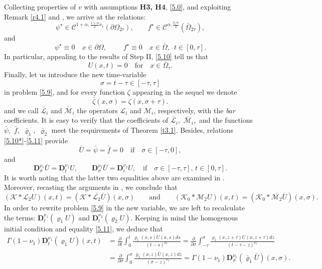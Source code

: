 \documentclass[reqno]{amsart}
\def\C {\mathcal{C}}
\theoremstyle{definition}
\numberwithin{equation}{section}
\begin{document}
Collecting properties of $v$ with assumptions \textbf{H3, H4}, \eqref{5.0}, and exploiting  Remark \ref{r4.1} and  \cite[Lemma 4.1]{KPV1}, we arrive at the relations:
\begin{equation}
\label{5.10*}
\psi^{\star}\in\C^{1+\alpha,\frac{1+\alpha}{2}\nu_{1}}(\partial\Omega_{2\tau}),\qquad f^{\star}\in\C^{\alpha,\frac{\nu_{1}\alpha}{2}}(\bar{\Omega}_{2\tau}),
\end{equation}
and
\begin{equation}\label{5.10}
\psi^{\star}\equiv 0 \quad x\in\partial\Omega, \,\,\qquad f^{\star}\equiv 0\quad x\in\bar{\Omega},\,\,\,  t\in[0,\tau].
\end{equation}
In particular, appealing to the results of Step II, \eqref{5.10} tell us that
\begin{equation}\label{5.11}
U(x,t)=0\quad\text{for}\quad x\in\bar{\Omega}_{\tau}.
\end{equation}
Finally, let us introduce the new time-variable
\[
\sigma=t-\tau\in[-\tau,\tau]
\]
in problem \eqref{5.9}, and for every function $\zeta$ appearing in the sequel we denote
$$\bar{\zeta}(x,\sigma)=\zeta(x,\sigma+\tau).$$
and we call 
$\bar{\mathcal{L}}_{i}$ and $\bar{\mathcal{M}}_{i}$ the operators 
${\mathcal{L}}_{i}$ and ${\mathcal{M}}_{i}$, respectively, with the \emph{bar} coefficients.
It is easy to verify that the coefficients of $\bar{\mathcal{L}}_{i},$ $\bar{\mathcal{M}}_{i},$ 
and the functions
$\bar{\psi},$ $\bar{f},$ $\bar{\varrho}_{1},$ $\bar{\varrho}_2$  meet the requirements of Theorem \ref{t3.1}. Besides, relations \eqref{5.10*}-\eqref{5.11} provide
$$
\bar{U}=\bar{\psi}=\bar{f}=0\quad\text{if}\quad \sigma\in[-\tau,0],$$
and
$$
\mathbf{D}_{\sigma}^{\nu_{1}}\bar{U}=\mathbf{D}_{t}^{\nu_{1}}U,\qquad
\mathbf{D}_{\sigma}^{\nu_{2}}\bar{U}=\mathbf{D}_{t}^{\nu_{2}}U,\quad\text{if}\quad \sigma\in[-\tau,\tau],\, t\in[0,\tau].
$$
It is worth noting that the latter two equalities above are examined in  \cite[(3.111)]{KV1}. Moreover, recasting the arguments in \cite[p.441]{KPV1}, we conclude that
\[
(\mathcal{K}*\mathcal{L}_{2}U)(x,t)=(\mathcal{K}*\bar{\mathcal{L}_{2}}\bar{U})(x,\sigma)\qquad
\text{and}\qquad
(\mathcal{K}_{0}*\mathcal{M}_{2}U)(x,t)=(\mathcal{K}_{0}*\bar{\mathcal{M}_{2}}\bar{U})(x,\sigma).\]
In order to rewrite problem \eqref{5.9} in the new variable, we are left to recalculate the terms: $\mathbf{D}_{t}^{\nu_1}(\varrho_{1} U)$
and $\mathbf{D}_{t}^{\nu_2}(\varrho_2 U)$. Keeping in mind the homogenous initial condition and equality \eqref{5.11}, we deduce that
\begin{align*}
\Gamma(1-\nu_{1})\mathbf{D}_{t}^{\nu_{1}}(\varrho_{1}U)(x,t)&=\frac{\partial}{\partial t}\int_{0}^{t}\frac{\varrho_{1}(x,s)U(x,s)ds}{(t-s)^{\nu_{1}}}
=\frac{\partial}{\partial \sigma}\int_{-\tau}^{\sigma}\frac{\varrho_{1}(x,z+\tau)U(x,z+\tau)dz}{(t-\tau-z)^{\nu_{1}}}\\
&
=\frac{\partial}{\partial \sigma}\int_{0}^{\sigma}\frac{\bar{\varrho}_{1}(x,z)\bar{U}(x,z)dz}{(\sigma-z)^{\nu_{1}}}
=\Gamma(1-\nu_{1})\mathbf{D}_{\sigma}^{\nu_{1}}(\bar{\varrho}_{1}\bar{U})(x,\sigma).
\end{align*}
\end{document}
